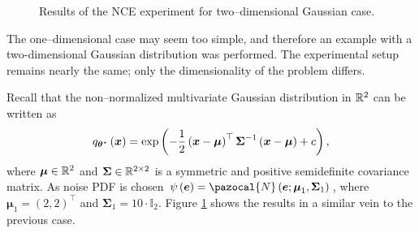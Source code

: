 \begin{example}
\begin{figure}[h]
	\centering
	\caption{Results of the NCE experiment for two--dimensional Gaussian case.}%
	\label{ex:NCE_2}%
\end{figure}
\end{example}
The one--dimensional case may seem too simple, and therefore an example with a two-dimensional Gaussian distribution was performed. The experimental setup remains nearly the same; only the dimensionality of the problem differs. 

Recall that the non--normalized multivariate Gaussian distribution in $\mathbb{R}^2$ can be written as
\begin{equation}
   q_{\boldsymbol{\theta}^\star}\left(\boldsymbol{x}\right) = \exp\left(-\frac{1}{2}\left(\boldsymbol{x} - \boldsymbol{\mu}\right)^\top\boldsymbol{\Sigma}^{-1}\left(\boldsymbol{x} - \boldsymbol{\mu}\right)+ c \right),
\end{equation}
where $\boldsymbol{\mu} \in \mathbb{R}^2$ and $\boldsymbol{\Sigma}\in \mathbb{R}^{2\times 2}$ is a symmetric and positive semidefinite covariance matrix. As noise PDF is chosen 
$\psi\left(\boldsymbol{e}\right)=\pazocal{N}\left(\boldsymbol{e}; \boldsymbol{\mu}_1,\boldsymbol{\Sigma}_1\right)$, where $\boldsymbol{\mu}_1 = \left(2,2\right)^\top$ and $\boldsymbol{\Sigma}_1=10\cdot\mathbb{I}_2$. Figure \ref{ex:NCE_2} shows the results in a similar vein to the previous case.

